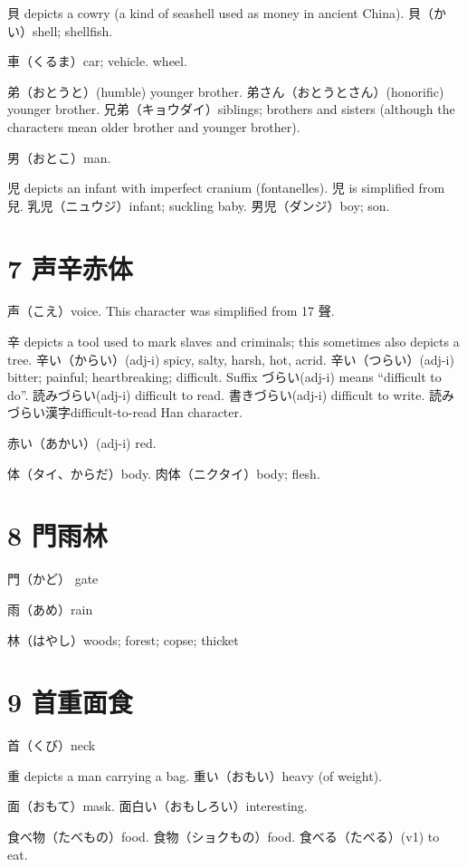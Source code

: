 貝 depicts a cowry (a kind of seashell used as money in ancient China).
貝（かい）shell; shellfish.

車（くるま）car; vehicle. wheel.

弟（おとうと）(humble) younger brother.
弟さん（おとうとさん）(honorific) younger brother.
兄弟（キョウダイ）siblings;
brothers and sisters
(although the characters mean older brother and younger brother).

男（おとこ）man.

児 depicts an infant with imperfect cranium (fontanelles).
児 is simplified from 兒.
乳児（ニュウジ）infant; suckling baby.
男児（ダンジ）boy; son.

\section{7 声辛赤体}

声（こえ）voice.
This character was simplified from 17 聲.

辛 depicts a tool used to mark slaves and criminals;
this sometimes also depicts a tree.
辛い（からい）(adj-i) spicy, salty, harsh, hot, acrid.
辛い（つらい）(adj-i) bitter; painful; heartbreaking; difficult.
Suffix づらい(adj-i) means ``difficult to do''.
読みづらい(adj-i) difficult to read.
書きづらい(adj-i) difficult to write.
読みづらい漢字difficult-to-read Han character.

赤い（あかい）(adj-i) red.

体（タイ、からだ）body.
肉体（ニクタイ）body; flesh.

\section{8 門雨林}

門（かど） gate

雨（あめ）rain

林（はやし）woods; forest; copse; thicket

\section{9 首重面食}

首（くび）neck

重 depicts a man carrying a bag.
重い（おもい）heavy (of weight).

面（おもて）mask.
面白い（おもしろい）interesting.

食べ物（たべもの）food.
食物（ショクもの）food.
食べる（たべる）(v1) to eat.

